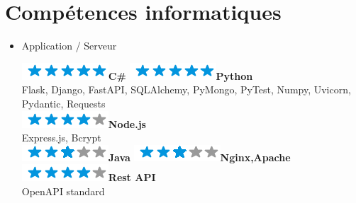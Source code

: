 \documentclass[]{friggeri-cv}
\begin{document}
\section{Compétences informatiques}
        \vspace*{-0.45cm}
        \setlength{\columnsep}{-0.3cm}
        \begin{flushleft}
        \begin{multicols}{3}
		\begin{itemize}
		
		\setlength{\itemsep}{5pt}
  		\setlength{\parskip}{0pt}
  		\setlength{\parsep}{0pt}
          
        
\item \large Application / Serveur \
\normalsize
\begin{flushleft}

\includegraphics[scale=0.40]{res/img/5stars.png}\hspace{1.5mm}\textbf{C\#}
\includegraphics[scale=0.40]{res/img/5stars.png}\hspace{1.5mm}\textbf{Python}\\Flask, Django, FastAPI, SQLAlchemy, PyMongo, PyTest, Numpy, Uvicorn, Pydantic, Requests\\\vspace{2mm}
\includegraphics[scale=0.40]{res/img/4stars.png}\hspace{1.5mm}\textbf{Node.js}\\Express.js, Bcrypt\\
\includegraphics[scale=0.40]{res/img/3stars.png}\hspace{1.5mm}\textbf{Java}
\includegraphics[scale=0.40]{res/img/3stars.png}\hspace{1.5mm}\textbf{\small Nginx,Apache}
\includegraphics[scale=0.40]{res/img/4stars.png}\hspace{1.5mm}\textbf{Rest API}\\OpenAPI standard\\
\end{flushleft}            


\end{itemize}
\end{multicols}
\end{flushleft}
\end{document}
